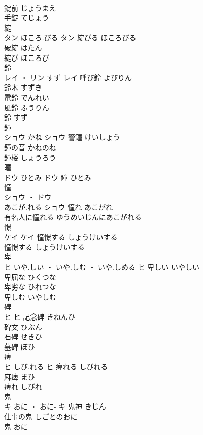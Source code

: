 \documentclass[8pt]{extreport}
\begin{document}
\begin{CJK}{UTF8}{min}
\\	錠前	じょうまえ	
\\	手錠	てじょう	
\\	綻	
\\	タン	ほころ.びる	タン	綻びる	ほころびる	
\\	破綻	はたん	
\\	綻び	ほころび	
\\	鈴	
\\	レイ ・ リン	すず	レイ	呼び鈴	よびりん	
\\	鈴木	すずき	
\\	電鈴	でんれい	
\\	風鈴	ふうりん	
\\	鈴	すず	
\\	鐘	
\\	ショウ	かね	ショウ	警鐘	けいしょう	
\\	鐘の音	かねのね	
\\	鐘楼	しょうろう	
\\	瞳	
\\	ドウ	ひとみ	ドウ													瞳	ひとみ	
\\	憧	
\\	ショウ ・ ドウ
\\	あこが.れる	ショウ	憧れ	あこがれ	
\\	有名人に憧れる	ゆうめいじんにあこがれる	
\\	憬	
\\	ケイ		ケイ	憧憬する	しょうけいする	
\\	憧憬する	しょうけいする	
\\	卑	
\\	ヒ	いや.しい ・ いや.しむ ・ いや.しめる	ヒ	卑しい	いやしい	
\\	卑屈な	ひくつな	
\\	卑劣な	ひれつな	
\\	卑しむ	いやしむ	
\\	碑	
\\	ヒ		ヒ	記念碑	きねんひ	
\\	碑文	ひぶん	
\\	石碑	せきひ	
\\	墓碑	ぼひ	
\\	痺	
\\	ヒ	しび.れる	ヒ	痺れる	しびれる	
\\	麻痺	まひ	
\\	痺れ	しびれ	
\\	鬼	
\\	キ	おに ・ おに-	キ	鬼神	きじん	
\\	仕事の鬼	しごとのおに	
\\	鬼	おに	

\end{CJK}
\end{document}

